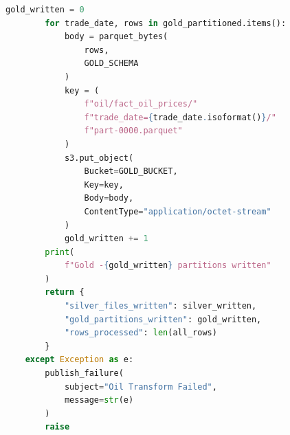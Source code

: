 \documentclass[11pt,a4paper]{article}
\begin{document}
\begin{lstlisting}[language=Python,
caption={Oil transformation},
label={lst:oil_transform_lambda}]
        gold_written = 0
        for trade_date, rows in gold_partitioned.items():
            body = parquet_bytes(
                rows,
                GOLD_SCHEMA
            )
            key = (
                f"oil/fact_oil_prices/"
                f"trade_date={trade_date.isoformat()}/"
                f"part-0000.parquet"
            )
            s3.put_object(
                Bucket=GOLD_BUCKET,
                Key=key,
                Body=body,
                ContentType="application/octet-stream"
            )
            gold_written += 1
        print(
            f"Gold -{gold_written} partitions written"
        )
        return {
            "silver_files_written": silver_written,
            "gold_partitions_written": gold_written,
            "rows_processed": len(all_rows)
        }
    except Exception as e:
        publish_failure(
            subject="Oil Transform Failed",
            message=str(e)
        )
        raise
\end{lstlisting}
\end{document}
